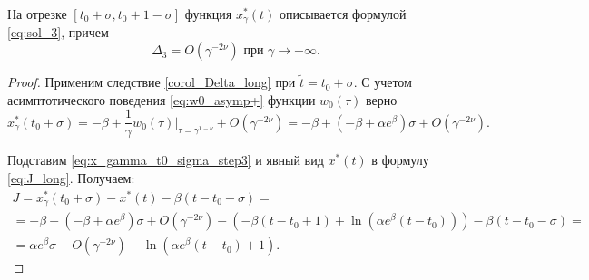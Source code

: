 \begin{lemma}
	\label{lm:Delta3}
	На отрезке $[t_0 + \sigma, t_0 + 1 - \sigma]$ функция $x_\gamma^*(t)$ описывается формулой \eqref{eq:sol_3}, причем
	\[
	\Delta_3 = O(\gamma^{-2\nu}) \text{ при } \gamma \to +\infty.
	\]
\end{lemma}
\begin{proof}
Применим следствие \ref{corol_Delta_long} при $\tilde{t} = t_0 + \sigma$. С учетом асимптотического поведения \eqref{eq:w0_asymp+} функции $w_0(\tau)$ верно
\begin{equation}
\label{eq:x_gamma_t0_sigma_step3}
	x_\gamma^*(t_0 + \sigma) = -\beta + \frac{1}{\gamma} w_0(\tau)|_{\tau=\gamma^{1 - \nu}} + O(\gamma^{-2\nu}) = -\beta + (-\beta + \alpha e^\beta)\sigma + O(\gamma^{-2\nu}).
\end{equation}

Подставим \eqref{eq:x_gamma_t0_sigma_step3} и явный вид $x^*(t)$ в формулу \eqref{eq:J_long}. Получаем:
\begin{multline}
	\label{eq:J_step3}
	J = x_\gamma^*(t_0 + \sigma) - x^*(t) - \beta(t - t_0 - \sigma) =\\
	= -\beta + (-\beta + \alpha e^\beta)\sigma + O(\gamma^{-2\nu}) - 
	(-\beta(t - t_0 + 1) + \ln(\alpha e^{\beta}(t - t_0))) - \beta (t - t_0 - \sigma) = \\
	 =\alpha e^\beta\sigma + O(\gamma^{-2\nu}) - \ln(\alpha e^{\beta}(t - t_0) + 1).
\end{multline}


\end{proof}
